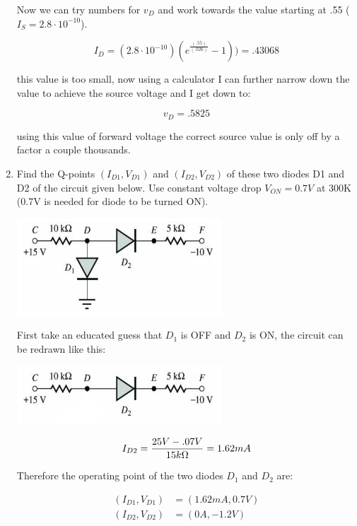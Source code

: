 \documentclass{article}
\begin{document}
\begin{enumerate}
\begin{center}
    Now we can try numbers for $v_D$ and work towards the value starting at .55 ($I_S = 2.8\cdot 10^{-10}$).    
\end{center}
\begin{equation}
    I_D = (2.8\cdot 10^{-10})(e^{\frac{(.55)}{(.026)}}-1)) = .43068
\end{equation}
\begin{center}
    this value is too small, now using a calculator I can further narrow down the value to achieve the source voltage and I get down to:
\end{center}
\begin{equation}
    v_D = .5825
\end{equation}
\begin{center}
    using this value of forward voltage the correct source value is only off by a factor a couple thousands.
\end{center}
\newpage
\item Find the Q-points $(I_{D1}, V_{D1})$ and $(I_{D2}, V_{D2})$ of these two diodes D1 and D2 of the circuit given below. Use constant voltage drop $V_{ON}= 0.7V$ at 300K (0.7V is needed for diode to be turned ON).



\begin{center}
    \includegraphics[width = .4\textwidth ]{p6.png}

    First take an educated guess that $D_1$ is OFF and $D_2$ is ON, the circuit can be redrawn like this:
    
    \includegraphics[width = .4\textwidth ]{p6-2.png}
\end{center}
\begin{equation}
    I_{D2} = \frac{25V - .07V}{15k\Omega} = 1.62mA\\
\end{equation}
\begin{center}
    Therefore the operating point of the two diodes $D_1$ and $D_2$ are:
\end{center}
\begin{align}
    (I_{D1}, V_{D1}) &= (1.62mA, 0.7V)\\  
    (I_{D2}, V_{D2}) &= (0A, -1.2V)
\end{align}
\newpage
\end{enumerate}
\end{document}
